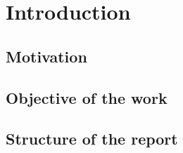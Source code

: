 
\chapter{Introduction}
\section{Motivation}
\section{Objective of the work}
\section{Structure of the report}